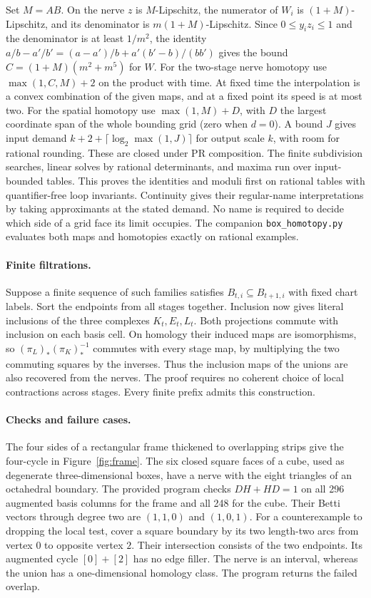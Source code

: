 Set $M=AB$. On the nerve $z$ is $M$-Lipschitz, the numerator of $W_i$ is
$(1+M)$-Lipschitz, and its denominator is $m(1+M)$-Lipschitz. Since
$0\le y_i z_i\le1$ and the denominator is at least $1/m^2$, the identity
$a/b-a'/b'=(a-a')/b+a'(b'-b)/(bb')$ gives the bound
$C=(1+M)(m^2+m^5)$ for $W$. For the two-stage nerve homotopy use
$\max(1,C,M)+2$ on the product with time. At fixed time the interpolation
is a convex combination of the given maps, and at a fixed point its
speed is at most two. For the spatial homotopy use
$\max(1,M)+D$, with $D$ the largest coordinate span of the whole bounding
grid (zero when $d=0$). A bound $J$ gives input demand
$k+2+\lceil\log_2\max(1,J)\rceil$ for output scale $k$,
with room for rational rounding. These are closed under PR composition.
The finite subdivision searches, linear solves by rational determinants,
and maxima run over input-bounded tables. This proves the identities and
moduli first on rational tables with quantifier-free loop invariants. Continuity gives their regular-name interpretations by taking approximants
at the stated demand. No name is required to decide which side of a
grid face its limit occupies. The companion \texttt{box\_homotopy.py}
evaluates both maps and homotopies exactly on rational examples.

\paragraph{Finite filtrations.}
Suppose a finite sequence of such families satisfies
$B_{t,i}\subseteq B_{t+1,i}$ with fixed chart labels. Sort the endpoints
from all stages together. Inclusion now gives literal inclusions of the
three complexes $K_t,E_t,L_t$. Both projections commute with inclusion on
each basis cell. On homology their induced maps are isomorphisms, so
$(\pi_L)_*(\pi_K)_*^{-1}$ commutes with every stage map, by multiplying the two commuting squares by the inverses. Thus the inclusion maps of the unions
are also recovered from the nerves. The proof requires no coherent choice
of local contractions across stages. Every finite prefix admits this construction.

\paragraph{Checks and failure cases.}
The four sides of a rectangular frame thickened to overlapping strips give
the four-cycle in Figure~\ref{fig:frame}. The six closed square faces of a cube, used
as degenerate three-dimensional boxes, have a nerve with the eight triangles
of an octahedral boundary. The provided program checks $DH+HD=1$ on all
296 augmented basis columns for the frame and all 248 for the cube. Their
Betti vectors through degree two are $(1,1,0)$ and $(1,0,1)$.
For a counterexample to dropping the local test, cover a square boundary by
its two length-two arcs from vertex $0$ to opposite vertex $2$. Their
intersection consists of the two endpoints. Its augmented cycle $[0]+[2]$
has no edge filler. The nerve is an interval, whereas the union has a
one-dimensional homology class. The program returns the failed overlap.

